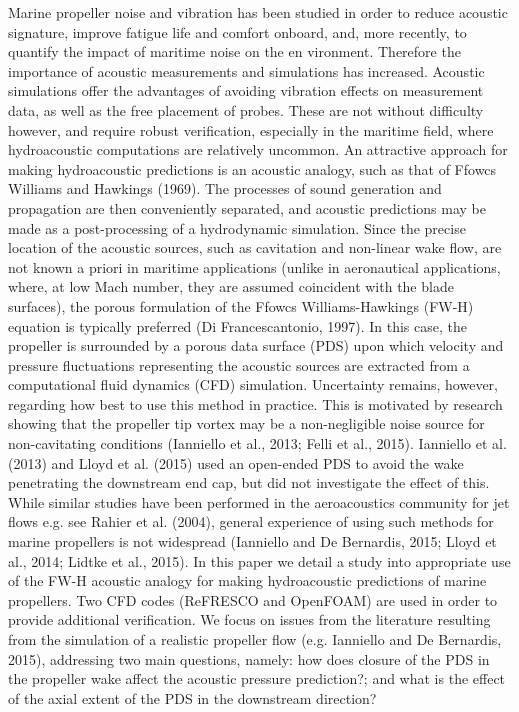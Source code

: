 \documentclass[a4paper,10pt]{article}
\begin{document}
	Marine propeller noise and vibration has been studied in order to reduce acoustic signature, improve fatigue life and comfort onboard, and, more recently, to quantify the impact of maritime noise on the en vironment. Therefore the importance of acoustic measurements and simulations has increased. Acoustic simulations offer the advantages of avoiding vibration effects on measurement data, as well as the free placement of probes. These are not without difficulty however, and require robust verification, especially in the maritime field, where hydroacoustic computations are relatively uncommon. An attractive approach for making hydroacoustic predictions is an acoustic analogy, such as that of Ffowcs Williams and Hawkings (1969). The processes of sound generation and propagation are then conveniently separated, and acoustic predictions may be made as a post-processing of a hydrodynamic simulation. Since the precise location of the acoustic sources, such as cavitation and non-linear wake flow, are not known a priori in maritime applications (unlike in aeronautical applications, where, at low Mach number, they are assumed coincident with the blade surfaces), the porous formulation of the Ffowcs Williams-Hawkings (FW-H) equation is typically preferred (Di Francescantonio, 1997). In this case, the propeller is surrounded by a porous data surface (PDS) upon which velocity and pressure fluctuations representing the acoustic sources are extracted from a computational fluid dynamics (CFD) simulation. Uncertainty remains, however, regarding how best to use this method in practice. This is motivated by research showing that the propeller tip vortex may be a non-negligible noise source for non-cavitating conditions (Ianniello et al., 2013; Felli et al., 2015). Ianniello et al. (2013) and Lloyd et al. (2015) used an open-ended PDS to avoid the wake penetrating the downstream end cap, but did not investigate the effect of this. While similar studies have been performed in the aeroacoustics community for jet flows e.g. see Rahier et al. (2004), general experience of using such methods for marine propellers is not widespread (Ianniello and De Bernardis, 2015; Lloyd et al., 2014; Lidtke et al., 2015). In this paper we detail a study into appropriate use of the FW-H acoustic analogy for making hydroacoustic predictions of marine propellers. Two CFD codes (ReFRESCO and OpenFOAM) are used in order to provide additional verification. We focus on issues from the literature resulting from the simulation of a realistic propeller flow (e.g. Ianniello and De Bernardis, 2015), addressing two main questions, namely: how does closure of the PDS in the propeller wake affect the acoustic pressure prediction?; and what is the effect of the axial extent of the PDS in the downstream direction?
\end{document}
